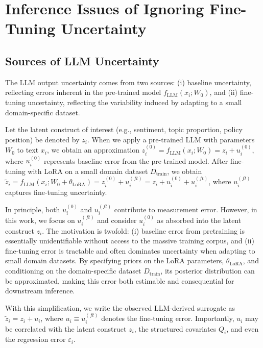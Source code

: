 \documentclass[11pt]{article}
\begin{document}
\newpage
\appendix

\section{Inference Issues of Ignoring Fine-Tuning Uncertainty}
\label{appendix:llm_inference}

\subsection{Sources of LLM Uncertainty}
The LLM output uncertainty comes from two sources: (i) baseline uncertainty, reflecting errors inherent in the pre-trained model $f_{\text{LLM}}(x_i; W_0)$, and (ii) fine-tuning uncertainty, reflecting the variability induced by adapting to a small domain-specific dataset.

Let the latent construct of interest (e.g., sentiment, topic proportion, policy position) be denoted by $z_i$. When we apply a pre-trained LLM with parameters $W_0$ to text $x_i$, we obtain an approximation $z_i^{(0)} = f_{\text{LLM}}(x_i; W_0) = z_i + u_i^{(0)}$, where $u_i^{(0)}$ represents baseline error from the pre-trained model. After fine-tuning with LoRA on a small domain dataset $D_{\text{train}}$, we obtain $\tilde{z}_i = f_{\text{LLM}}(x_i; W_0 + \theta_{\text{LoRA}}) = z_i^{(0)} + u_i^{(ft)} = z_i + u_i^{(0)} + u_i^{(ft)}$, where $u_i^{(ft)}$ captures fine-tuning uncertainty.

In principle, both $u_i^{(0)}$ and $u_i^{(ft)}$ contribute to measurement error. However, in this work, we focus on $u_i^{(ft)}$ and consider $u_i^{(0)}$ as absorbed into the latent construct $z_i$. The motivation is twofold: (i) baseline error from pretraining is essentially unidentifiable without access to the massive training corpus, and (ii) fine-tuning error is tractable and often dominates uncertainty when adapting to small domain datasets. By specifying priors on the LoRA parameters, $\theta_{\text{LoRA}}$, and conditioning on the domain-specific dataset $D_{\text{train}}$, its posterior distribution can be approximated, making this error both estimable and consequential for downstream inference.

With this simplification, we write the observed LLM-derived surrogate as $\tilde{z}_i = z_i + u_i$, where $u_i \equiv u_i^{(ft)}$ denotes the fine-tuning error. 
Importantly, $u_i$ may be correlated with the latent construct $z_i$, the structured covariates $Q_i$, and even the regression error $\varepsilon_i$.
\end{document}
